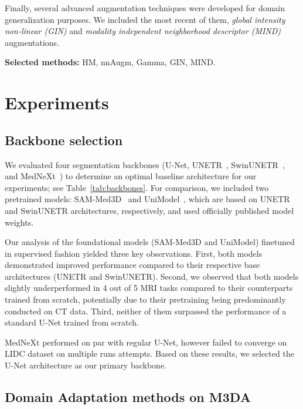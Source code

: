 Finally, several advanced augmentation techniques were developed for domain generalization purposes. We included the most recent of them, \textit{global intensity non-linear (GIN)} \cite{gin} and \textit{modality independent neighborhood descriptor (MIND)} \cite{dg_tta} augmentations.

\textbf{Selected methods:} HM, nnAugm, Gamma, GIN, MIND.\\



\section{Experiments}


\subsection{Backbone selection}

We evaluated four segmentation backbones (U-Net, UNETR~\cite{unetr}, SwinUNETR~\cite{swinunetr}, and MedNeXt~\cite{mednext}) to determine an optimal baseline architecture for our experiments; see Table~\ref{tab:backbones}. For comparison, we included two pretrained models: SAM-Med3D~\cite{sammed} and UniModel~\cite{unimodel}, which are based on UNETR and SwinUNETR architectures, respectively, and used officially published model weights.



Our analysis of the foundational models (SAM-Med3D and UniModel) finetuned in supervised fashion yielded three key observations. First, both models demonstrated improved performance compared to their respective base architectures (UNETR and SwinUNETR). Second, we observed that both models slightly underperformed in 4 out of 5 MRI tasks compared to their counterparts trained from scratch, potentially due to their pretraining being predominantly conducted on CT data. Third, neither of them surpassed the performance of a standard U-Net trained from scratch.

MedNeXt performed on par with regular U-Net, however failed to converge on LIDC dataset on multiple runs attempts. %
Based on these results, we selected the U-Net architecture as our primary backbone.


\subsection{Domain Adaptation methods on M3DA}


